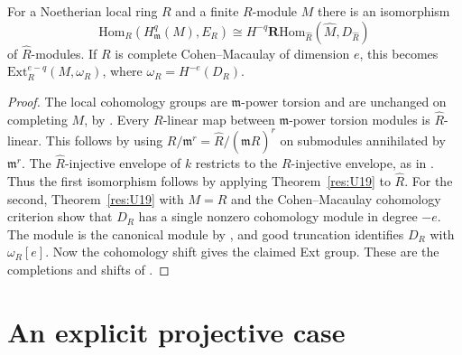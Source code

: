 \begin{corollary}\label{res:U20}
For a Noetherian local ring \(R\) and a finite \(R\)-module \(M\)
there is an isomorphism
\[
 \mathrm{Hom}_R(H^q_{\mathfrak m}(M),E_R)
   \cong H^{-q}\mathbf R\mathrm{Hom}_{\widehat R}
                             (\widehat M,D_{\widehat R})
\]
of \(\widehat R\)-modules. If \(R\) is complete Cohen--Macaulay
of dimension \(e\), this becomes
\(\mathrm{Ext}^{e-q}_R(M,\omega_R)\), where
\(\omega_R=H^{-e}(D_R)\).
\end{corollary}
\begin{proof}
The local cohomology groups are \(\mathfrak m\)-power torsion
and are unchanged on completing \(M\), by \cite[L02, L09]{ca-topics}.
Every \(R\)-linear map between \(\mathfrak m\)-power torsion
modules is \(\widehat R\)-linear. This follows by using
\(R/\mathfrak m^r=\widehat R/(\mathfrak m\widehat R)^r\)
on submodules annihilated by \(\mathfrak m^r\). The
\(\widehat R\)-injective envelope of \(k\) restricts
to the \(R\)-injective envelope, as in \cite[M06]{ca-topics}.
Thus the first isomorphism follows by applying
Theorem~\ref{res:U19} to \(\widehat R\). For the second,
Theorem~\ref{res:U19} with \(M=R\) and the
Cohen--Macaulay cohomology criterion \cite[V07]{ca-topics}
show that \(D_R\) has a single nonzero cohomology
module in degree \(-e\). The module is the canonical
module by \cite[D08]{ca-topics}, and good truncation
identifies \(D_R\) with \(\omega_R[e]\). Now the
cohomology shift gives the claimed Ext group. These
are the completions and shifts of \cite[D07--D09]{ca-topics}.
\end{proof}

\section{An explicit projective case}

